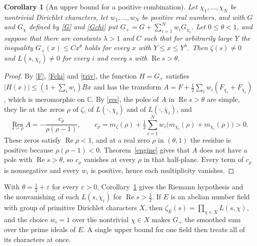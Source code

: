 \documentclass[11pt,letterpaper]{article}
\newtheorem{corollary}[theorem]{Corollary}
\numberwithin{equation}{section}
\begin{document}
\begin{corollary}[An upper bound for a positive combination]\label{corA}
Let $\chi_1,\dots,\chi_N$ be nontrivial Dirichlet characters, let $w_1,\dots,w_N$ be positive real numbers, and with $G$ and $G_\chi$ defined by \eqref{G} and \eqref{Gchi} put $G_+=G+\sum_{i=1}^Nw_iG_{\chi_i}$. Let $0\le\theta<1$, and suppose that there are constants $\lambda>1$ and $C$ such that for arbitrarily large $Y$ the inequality $G_+(x)\le Cx^\theta$ holds for every $x$ with $Y\le x\le Y^\lambda$. Then $\zeta(s)\ne0$ and $L(s,\chi_i)\ne0$ for every $i$ and every $s$ with $\operatorname{Re}s>\theta$.
\end{corollary}
\begin{proof}
By \eqref{F}, \eqref{Fchi} and \eqref{triv}, the function $H=G_+$ satisfies $|H(x)|\le(1+\sum_iw_i)Bx$ and has the transform $A=F+\tfrac12\sum_iw_i(F_{\chi_i}+F_{\bar\chi_i})$, which is meromorphic on $\mathbb C$. By \eqref{res}, the poles of $A$ in $\operatorname{Re}s>\theta$ are simple, they lie at the zeros $\rho$ of $\zeta$, of $L(\cdot,\chi_i)$ and of $L(\cdot,\bar\chi_i)$, and
\[
\operatorname*{Res}_{s=\rho}A=-\frac{c_\rho}{\rho(\rho-1)},\qquad c_\rho=m_\zeta(\rho)+\tfrac12\sum_{i=1}^Nw_i\big(m_{\chi_i}(\rho)+m_{\bar\chi_i}(\rho)\big)>0 .
\]
These zeros satisfy $\operatorname{Re}\rho<1$, and at a real zero $\rho$ in $(\theta,1)$ the residue is positive because $\rho(\rho-1)<0$. Theorem~\ref{engine} gives that $A$ does not have a pole with $\operatorname{Re}s>\theta$, so $c_\rho$ vanishes at every $\rho$ in that half-plane. Every term of $c_\rho$ is nonnegative and every $w_i$ is positive, hence each multiplicity vanishes.
\end{proof}

With $\theta=\tfrac12+\varepsilon$ for every $\varepsilon>0$, Corollary~\ref{corA} gives the Riemann hypothesis and the nonvanishing of each $L(s,\chi_i)$ for $\operatorname{Re}s>\tfrac12$. If $E$ is an abelian number field with group of primitive Dirichlet characters $X$, then $\zeta_E(s)=\prod_{\chi\in X}L(s,\chi)$, and the choice $w_i=1$ over the nontrivial $\chi\in X$ makes $G_+$ the smoothed sum over the prime ideals of $E$. A single upper bound for one field then treats all of its characters at once.
\end{document}
